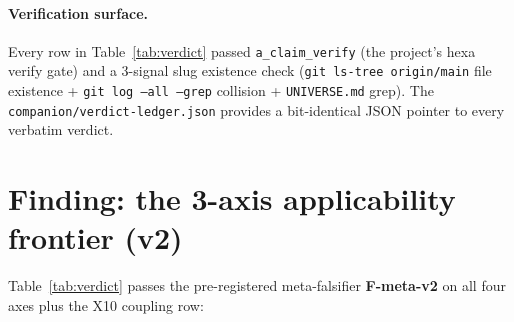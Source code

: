 \documentclass[11pt,a4paper]{article}
\begin{document}
\paragraph{Verification surface.}
Every row in Table~\ref{tab:verdict} passed \texttt{a\_claim\_verify} (the
project's hexa verify gate) and a 3-signal slug existence check
(\texttt{git ls-tree origin/main} file existence + \texttt{git log --all
--grep} collision + \texttt{UNIVERSE.md} grep). The
\texttt{companion/verdict-ledger.json} provides a bit-identical JSON
pointer to every verbatim verdict.

\section{Finding: the 3-axis applicability frontier (v2)}
\label{sec:finding}

Table~\ref{tab:verdict} passes the pre-registered meta-falsifier
\textbf{F-meta-v2} on all four axes plus the X10 coupling row:
\end{document}
